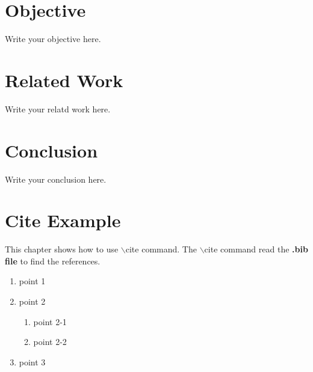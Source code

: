 \newpage
{}
\chapter{Objective}
\pagestyle{plain}

Write your objective here.

\clearpage
{}

\newpage
{}
\chapter{Related Work}
\pagestyle{plain}

Write your relatd work here.

\clearpage
{}

\newpage
{}
\chapter{Conclusion}
\pagestyle{plain}

Write your conclusion here.

\clearpage
{}

\newpage
{}
\chapter{Cite Example}
\pagestyle{plain}

This chapter shows how to use $\backslash$cite command. The $\backslash$cite command read the \textbf{.bib file} to find the references.

\begin{enumerate}
  \item{point 1 \cite{test1}}
  \item{point 2 \cite{test2}}
    \begin{enumerate}
      \item{point 2-1 \cite{test3}}
      \item{point 2-2}
    \end{enumerate}
  \item{point 3 \cite{test4}}
\end{enumerate}


